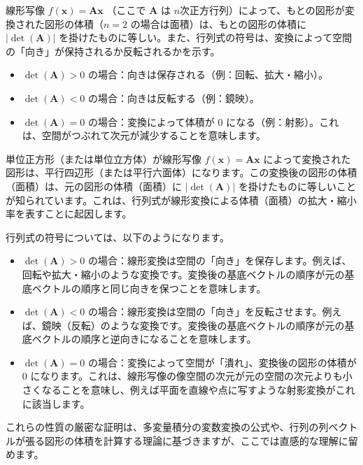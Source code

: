 \begin{thm}[行列式の幾何学的意味] \label{geometric_determinant}
線形写像 $f(\bm{x}) = \bm{A}\bm{x}$ （ここで $\bm{A}$ は $n$次正方行列）によって、もとの図形が変換された図形の体積（$n=2$ の場合は面積）は、もとの図形の体積に $|\det(\bm{A})|$ を掛けたものに等しい。また、行列式の符号は、変換によって空間の「向き」が保持されるか反転されるかを示す。
\begin{itemize}
    \item $\det(\bm{A}) > 0$ の場合：向きは保存される（例：回転、拡大・縮小）。
    \item $\det(\bm{A}) < 0$ の場合：向きは反転する（例：鏡映）。
    \item $\det(\bm{A}) = 0$ の場合：変換によって体積が $0$ になる（例：射影）。これは、空間がつぶれて次元が減少することを意味します。
\end{itemize}
\begin{proof*}
単位正方形（または単位立方体）が線形写像 $f(\bm{x}) = \bm{A}\bm{x}$ によって変換された図形は、平行四辺形（または平行六面体）になります。この変換後の図形の体積（面積）は、元の図形の体積（面積）に $|\det(\bm{A})|$ を掛けたものに等しいことが知られています。これは、行列式が線形変換による体積（面積）の拡大・縮小率を表すことに起因します。\par
行列式の符号については、以下のようになります。
\begin{itemize}
    \item $\det(\bm{A}) > 0$ の場合：線形変換は空間の「向き」を保存します。例えば、回転や拡大・縮小のような変換です。変換後の基底ベクトルの順序が元の基底ベクトルの順序と同じ向きを保つことを意味します。
    \item $\det(\bm{A}) < 0$ の場合：線形変換は空間の「向き」を反転させます。例えば、鏡映（反転）のような変換です。変換後の基底ベクトルの順序が元の基底ベクトルの順序と逆向きになることを意味します。
    \item $\det(\bm{A}) = 0$ の場合：変換によって空間が「潰れ」、変換後の図形の体積が $0$ になります。これは、線形写像の像空間の次元が元の空間の次元よりも小さくなることを意味し、例えば平面を直線や点に写すような射影変換がこれに該当します。
\end{itemize}
これらの性質の厳密な証明は、多変量積分の変数変換の公式や、行列の列ベクトルが張る図形の体積を計算する理論に基づきますが、ここでは直感的な理解に留めます。
\end{proof*}
\end{thm}

